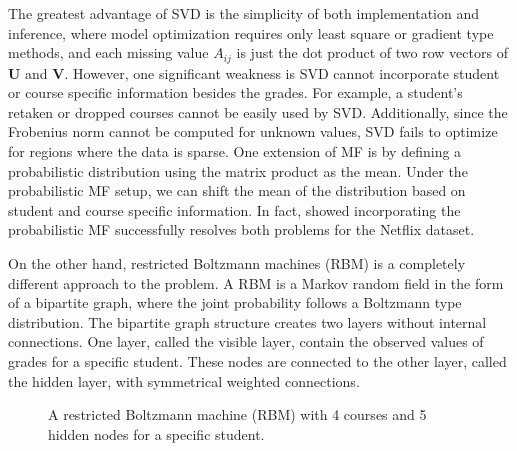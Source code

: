 \documentclass[12pt]{article}
\begin{document}
The greatest advantage of SVD is the simplicity of 
both implementation and inference,
where model optimization requires only least square
or gradient type methods,
and each missing value $A_{ij}$ is just 
the dot product of two row vectors of $\mathbf{U}$
and $\mathbf{V}$.
However, one significant weakness is SVD cannot incorporate 
student or course specific information besides the grades.
For example, a student's retaken or dropped courses cannot be easily
used by SVD.
Additionally, since the Frobenius norm cannot be computed for 
unknown values, SVD fails to optimize for regions where
the data is sparse.
One extension of MF is by defining a probabilistic distribution 
using the matrix product as the mean.
Under the probabilistic MF setup,
we can shift the mean of the distribution based on 
student and course specific information.
In fact, \cite{MnSa07} showed incorporating the probabilistic MF
successfully resolves both problems for the Netflix dataset.

On the other hand, restricted Boltzmann machines (RBM) is a
completely different approach to the problem.
A RBM is a Markov random field in the form of a bipartite graph,
where the joint probability follows a Boltzmann type distribution.
The bipartite graph structure creates two layers without
internal connections.
One layer, called the visible layer, contain the 
observed values of grades for a specific student.
These nodes are connected to the other layer, called the hidden layer,
with symmetrical weighted connections.
%
\def\layersep{2.5cm}
\begin{figure}[h]
\centering{}

\caption{\label{fig:RBM}
A restricted Boltzmann machine (RBM) with 4 courses and 5 hidden
nodes for a specific student.
}
\end{figure}
\end{document}
